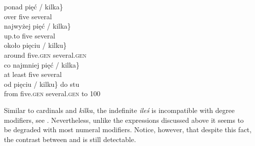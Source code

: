 \documentclass[output=paper,
]{langscibook}
\begin{document}
\begin{multicols}{2}
	\columnbreak	

		\ea \label{ex:degree-modifiers-cardinals-kilka} 
		\z
        \z
        
		\ea \label{ex:numeral-modifiers-cardinals-kilka} \ea \gll ponad \minsp{\{} pięć / {kilka\}}\\
		over {} five {} several\\
		\ex \gll najwyżej \minsp{\{} pięć / {kilka\}}\\
		up.to {} five {} several\\
		\ex \gll około \minsp{\{} pięciu / {kilku\}}\\
		around {} five.\textsc{gen} {} several.\textsc{gen}\\
		\ex \gll co najmniej \minsp{\{} pięć / {kilka\}}\\
		at least {} five {} several\\
		\ex \gll od \minsp{\{} pięciu / {kilku\}} do stu\\
		from {} five.\textsc{gen} {} several.\textsc{gen} to 100\\
		\z
        \z

	\end{multicols}
	
	\noindent Similar to cardinals and \textit{kilka}, the indefinite \textit{ileś} is incompatible with degree modifiers, see . Nevertheless, unlike the expressions discussed above it seems to be degraded with most numeral modifiers. Notice, however, that despite this fact, the contrast between  and  is still detectable.
	
\end{document}
